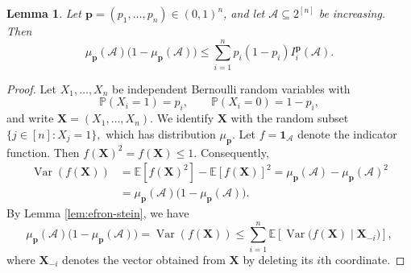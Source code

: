 \documentclass[11pt]{article}
\numberwithin{equation}{section}
\newtheorem{lemma}[theorem]{Lemma}
\theoremstyle{definition}
\theoremstyle{remark}
\begin{document}
\begin{lemma}\label{lem:efron-stein-influence}
Let $\mathbf p=(p_1,\ldots,p_n)\in(0,1)^n$, and let
$\mathcal{A}\subseteq2^{[n]}$ be increasing. Then
$$
 \mu_{\mathbf p}(\mathcal{A})
 \bigl(1-\mu_{\mathbf p}(\mathcal{A})\bigr)
 \leq
 \sum_{i=1}^n
 p_i(1-p_i)I_i^{\mathbf p}(\mathcal{A}).
 $$
\end{lemma}

\begin{proof}
Let $X_1,\ldots,X_n$ be independent Bernoulli random variables with
\begin{equation*}
 \mathbb P(X_i=1)=p_i,
 \qquad
 \mathbb P(X_i=0)=1-p_i,
\end{equation*}
and write
$
 \mathbf X=(X_1,\ldots,X_n).
$
We identify $\mathbf X$ with the random subset
$
 \{j\in[n]:X_j=1\},
$
which has distribution $\mu_{\mathbf p}$. Let
$
 f=\mathbf 1_{\mathcal{A}}
$
denote the indicator function. Then
$
 f(\mathbf X)^2=f(\mathbf X)\leq 1. 
$
Consequently,
\begin{align*}
 \operatorname{Var}(f(\mathbf X))
 &=
 \mathbb E[f(\mathbf X)^2]
 -
 \mathbb E[f(\mathbf X)]^2=
 \mu_{\mathbf p}(\mathcal{A})
 -
 \mu_{\mathbf p}(\mathcal{A})^2\\
 &=
 \mu_{\mathbf p}(\mathcal{A})
 \bigl(1-\mu_{\mathbf p}(\mathcal{A})\bigr).
\end{align*}
By Lemma \ref{lem:efron-stein}, we have
$$
 \mu_{\mathbf p}(\mathcal{A})
 \bigl(1-\mu_{\mathbf p}(\mathcal{A})\bigr)=\operatorname{Var}(f(\mathbf X))
 \leq
 \sum_{i=1}^n
 \mathbb E\left[
 \operatorname{Var}
 \bigl(f(\mathbf X)\mid\mathbf X_{-i}\bigr)
 \right],
$$
where $\mathbf X_{-i}$ denotes the vector obtained from $\mathbf X$ by
deleting its $i$th coordinate.


\end{proof}
\end{document}
